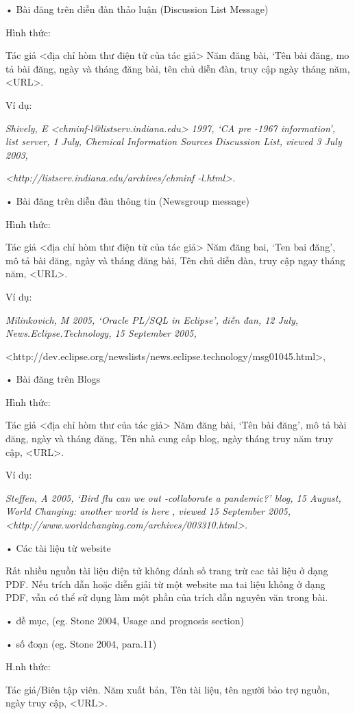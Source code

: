 \documentclass{hcmutarticle}
\begin{document}
•	Bài đăng trên diễn đàn thảo luận (Discussion List Message)

Hình thức:

Tác giả <địa chỉ hòm thư điện tử của tác giả> Năm đăng bài, ‘Tên bài đăng, mo tả bài đăng, ngày và tháng đăng bài, tên chủ diễn đàn, truy cập ngày tháng năm, <URL>.

Ví dụ:

{\em Shively, E <chminf-l@listserv.indiana.edu> 1997, ‘CA pre -1967 information’, list server, 1 July, Chemical Information Sources Discussion List, viewed 3 July 2003,}

{\em <http://listserv.indiana.edu/archives/chminf -l.html>.}


•	Bài đăng trên diễn đàn thông tin (Newsgroup message)

Hình thức:


Tác giả <địa chỉ hòm thư điện tử của tác giả> Năm đăng bai, ‘Ten bai đăng’, mô tả bài đăng, ngày và tháng đăng bài, Tên chủ diễn đàn, truy cập ngay tháng năm, <URL>.

Ví dụ:

{\em Milinkovich, M 2005, ‘Oracle PL/SQL in Eclipse’, diễn đan, 12 July, News.Eclipse.Technology, 15 September 2005,

<http://dev.eclipse.org/newslists/news.eclipse.technology/msg01045.html>,
}
•	Bài đăng trên Blogs

Hình thức:

Tác giả <địa chỉ hòm thư của tác giả> Năm đăng bài, ‘Tên bài đăng’, mô tả bài đăng, ngày và tháng đăng, Tên nhà cung cấp blog, ngày tháng truy năm truy cập, <URL>.

Ví dụ:

{\em Steffen, A 2005, ‘Bird flu can we out -collaborate a pandemic?’ blog, 15 August, World Changing: another world is here , viewed 15 September 2005, <http://www.worldchanging.com/archives/003310.html>.}

•	Các tài liệu từ website

Rất nhiều nguồn tài liệu điện tử không đánh số trang trừ cac tài liệu ở dạng PDF. Nếu trích dẫn hoặc diễn giải từ một website ma tai liệu không ở dạng PDF, vẫn có thể sử dụng làm một phần của trích dẫn nguyên văn trong bài.

• đề mục, (eg. Stone 2004, Usage and prognosis section)

• số đoạn (eg. Stone 2004, para.11)

H.nh thức:

Tác giả/Biên tập viên. Năm xuất bản, Tên tài liệu, tên người bảo trợ nguồn, ngày truy cập, <URL>.
\end{document}
